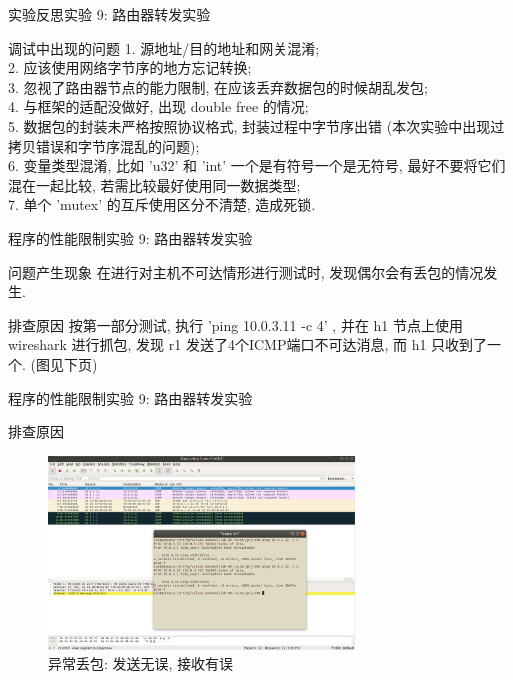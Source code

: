\documentclass{beamer}
\begin{document}
\begin{frame}{实验反思}{实验 9: 路由器转发实验}
    \begin{alertblock}{调试中出现的问题}
        1. 源地址/目的地址和网关混淆;\\
        2. 应该使用网络字节序的地方忘记转换;\\
        3. 忽视了路由器节点的能力限制,
        在应该丢弃数据包的时候胡乱发包;\\
        4. 与框架的适配没做好, 出现 double free 的情况;\\
        5. 数据包的封装未严格按照协议格式,
        封装过程中字节序出错
        (本次实验中出现过拷贝错误和字节序混乱的问题);\\
        6. 变量类型混淆, 比如 'u32' 和 'int'
        一个是有符号一个是无符号, 最好不要将它们混在一起比较,
        若需比较最好使用同一数据类型;\\
        7. 单个 'mutex' 的互斥使用区分不清楚, 造成死锁.
    \end{alertblock}
\end{frame}
\begin{frame}{程序的性能限制}{实验 9: 路由器转发实验}
    \begin{alertblock}{问题产生现象}
        在进行对主机不可达情形进行测试时, 发现偶尔会有丢包的情况发生.
    \end{alertblock}
    \begin{block}{排查原因}
        按第一部分测试, 执行 'ping 10.0.3.11 -c 4' ,
        并在 h1 节点上使用 wireshark 进行抓包,
        发现 r1 发送了4个ICMP端口不可达消息,
        而 h1 只收到了一个. (图见下页)
    \end{block}
\end{frame}
\begin{frame}{程序的性能限制}{实验 9: 路由器转发实验}
    \begin{block}{排查原因}
        \begin{figure}[h]
            \centering %
            \includegraphics[width=230pt]{
                ../lab-09-router/readme.assets/burst-example.png}
            \caption{异常丢包: 发送无误, 接收有误} %
        \end{figure}
    \end{block}
\end{frame}
\end{document}
